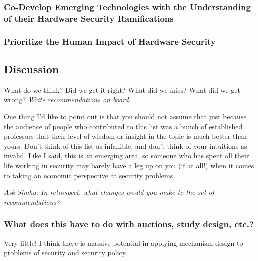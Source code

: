 \documentclass[11pt]{article}
\begin{document}
\subsubsection{Co-Develop Emerging Technologies with the Understanding of their Hardware Security Ramifications}

\subsubsection{Prioritize the Human Impact of Hardware Security}

\subsection{Discussion}

What do we think? Did we get it right? What did we miss? What did we get wrong? {\it Write recommendations on board.}

One thing I'd like to point out is that you should not assume that just because the audience of people who contributed to this list was a bunch of established professors that their level of wisdom or insight in the topic is much better than yours. Don't think of this list as infallible, and don't think of your intuitions as invalid. Like I said, this is an emerging area, so someone who has spent all their life working in security may barely have a leg up on you (if at all!) when it comes to taking an economic perspective at security problems. 

{\it Ask Simha: In retrospect, what changes would you make to the set of recommendations?}

\subsubsection{What does this have to do with auctions, study design, etc.?}

Very little! I think there is massive potential in applying mechanism design to problems of security and security policy. 
\end{document}

